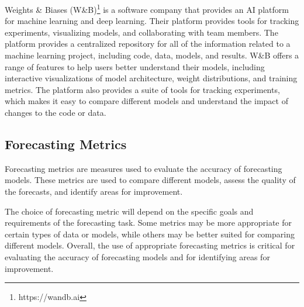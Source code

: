     Weights \& Biases (W\&B)\footnote{https://wandb.ai} is a software company that provides an AI platform for machine learning and deep learning. Their platform provides tools for tracking experiments, visualizing models, and collaborating with team members.
    The platform provides a centralized repository for all of the information related to a machine learning project, including code, data, models, and results.
    W\&B offers a range of features to help users better understand their models, including interactive visualizations of model architecture, weight distributions, and training metrics. The platform also provides a suite of tools for tracking experiments, which makes it easy to compare different models and understand the impact of changes to the code or data.



  
  \subsection{Forecasting Metrics}
  \label{sec:forecasting-metrics-evaluation-setup}

    Forecasting metrics \cite{botchkarevPerformanceMetricsError2018} are measures used to evaluate the accuracy of forecasting models. These metrics are used to compare different models, assess the quality of the forecasts, and identify areas for improvement.





    The choice of forecasting metric will depend on the specific goals and requirements of the forecasting task. Some metrics may be more appropriate for certain types of data or models, while others may be better suited for comparing different models.
    Overall, the use of appropriate forecasting metrics is critical for evaluating the accuracy of forecasting models and for identifying areas for improvement.

